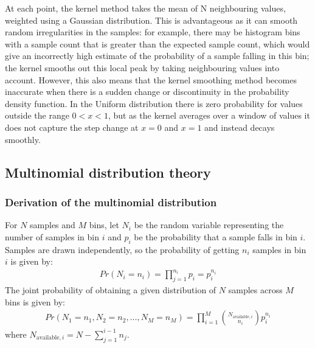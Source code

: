 \documentclass[a4paper]{article}
\begin{document}
At each point, the kernel method takes the mean of N neighbouring values, weighted using a Gaussian distribution.
This is advantageous as it can smooth random irregularities in the samples: for example, there may be histogram bins
with a sample count that is greater than the expected sample count, which would give an incorrectly high estimate of
the probability of a sample falling in this bin; the kernel smooths out this local peak by taking neighbouring values
into account.
However, this also means that the kernel smoothing method becomes inaccurate when there is a sudden change or
discontinuity in the probability density function.
In the Uniform distribution there is zero probability for values outside the range $0<x<1$, but as the kernel averages
over a window of values it does not capture the step change at $x=0$ and $x=1$ and instead decays smoothly.


\subsection{Multinomial distribution theory}

\subsubsection{Derivation of the multinomial distribution}
For $N$ samples and $M$ bins, let $N_i$ be the random variable representing the number of samples in bin $i$ and $p_i$
be the probability that a sample falls in bin $i$.
Samples are drawn independently, so the probability of getting $n_i$ samples in bin $i$ is given by:
\begin{align*}
    Pr(N_i = n_i) = \prod_{j=1}^{n_i} p_i = p_i^{n_i}
\end{align*}
The joint probability of obtaining a given distribution of $N$ samples across $M$ bins is given by:
\begin{align}
    \label{eq:joint_bin_probability_1}
    Pr(N_1 = n_1, N_2 = n_2, \dots, N_M= n_M) =
     \prod_{i=1}^{M} {N_{\text{available}, i} \choose {n_i}} p_i^{n_i}
\end{align}
where $N_{\text{available}, i} = N - \sum_{j=1}^{i-1} n_j$.
\end{document}
